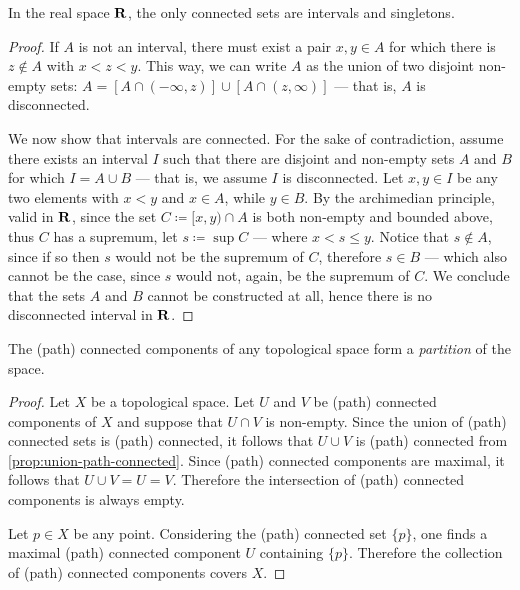 \begin{theorem}
\label{thm:connected-interval-real-space}
In the real space \(\mathbf{R}\), the only connected sets are intervals and singletons.
\end{theorem}

\begin{proof}
If \(A\) is not an interval, there must exist a pair \(x, y \in A\) for which
there is \(z \notin A\) with \(x < z < y\). This way, we can write \(A\) as the
union of two disjoint non-empty sets:
\(A = [A \cap (-\infty, z)] \cup [A \cap (z, \infty)]\) --- that is, \(A\) is
disconnected.

We now show that intervals are connected. For the sake of contradiction, assume
there exists an interval \(I\) such that there are disjoint and non-empty sets
\(A\) and \(B\) for which \(I = A \cup B\) --- that is, we assume \(I\) is
disconnected. Let \(x, y \in I\) be any two elements with \(x < y\) and
\(x \in A\), while \(y \in B\). By the archimedian principle, valid in \(\mathbf{R}\),
since the set \(C \coloneq [x, y) \cap A\) is both non-empty and bounded above,
thus \(C\) has a supremum, let \(s \coloneq \sup C\) --- where \(x < s \leq
y\). Notice that \(s \notin A\), since if so then \(s\) would not be the
supremum of \(C\), therefore \(s \in B\) --- which also cannot be the case,
since \(s\) would not, again, be the supremum of \(C\). We conclude that the
sets \(A\) and \(B\) cannot be constructed at all, hence there is no
disconnected interval in \(\mathbf{R}\).
\end{proof}

\begin{proposition}
\label{prop:connected-components-partition}
The (path) connected components of any topological space form a \emph{partition}
of the space.
\end{proposition}

\begin{proof}
Let \(X\) be a topological space. Let \(U\) and \(V\) be (path) connected
components of \(X\) and suppose that \(U \cap V\) is non-empty. Since the union
of (path) connected sets is (path) connected, it follows that \(U \cup V\) is
(path) connected from \cref{prop:union-path-connected}. Since (path) connected
components are maximal, it follows that \(U \cup V = U = V\). Therefore the
intersection of (path) connected components is always empty.

Let \(p \in X\) be any point. Considering the (path) connected set \(\{p\}\),
one finds a maximal (path) connected component \(U\) containing
\(\{p\}\). Therefore the collection of (path) connected components covers \(X\).
\end{proof}

